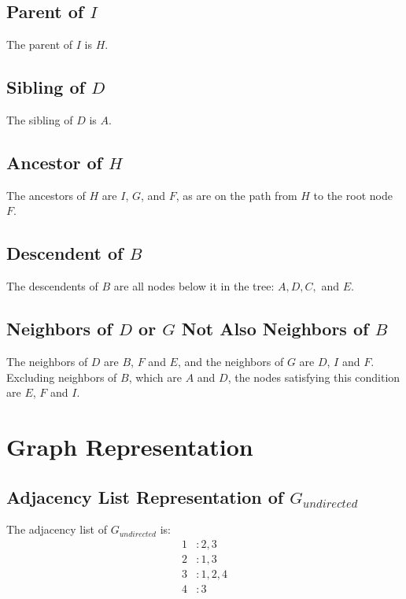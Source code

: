 \documentclass[10pt]{article}
\begin{document}
\subsection{Parent of \( I \)}
The parent of \( I \) is \( H \).

\subsection{Sibling of \( D \)}
The sibling of \( D \) is \( A \).

\subsection{Ancestor of \( H \)}
The ancestors of \( H \) are \( I \), \( G \), and $F$, as are on the path from \( H \) to the root node \( F \).

\subsection{Descendent of \( B \)}
The descendents of \( B \) are all nodes below it in the tree: \( A, D, C, \) and \( E \).

\subsection{Neighbors of \( D \) or \( G \) Not Also Neighbors of \( B \)}
The neighbors of \( D \) are \( B \), $F$ and \( E \), and the neighbors of \( G \) are \( D \), $I$ and \( F \). Excluding neighbors of \( B \), which are $A$ and $D$, the nodes satisfying this condition are $E$, \( F \) and $I$.

\newpage

\section{Graph Representation}

\subsection{Adjacency List Representation of \( G_{undirected} \)}
The adjacency list of \( G_{undirected} \) is:
\[
\begin{aligned}
    1 & : 2, 3 \\
    2 & : 1, 3 \\
    3 & : 1, 2, 4 \\
    4 & : 3 \\
\end{aligned}
\]
\end{document}
